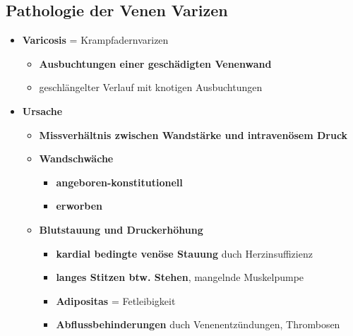 	\subsection{Pathologie der Venen Varizen}
		\begin{itemize}
			\item \textbf{Varicosis} = Krampfadernvarizen
				\begin{itemize}
					\item \textbf{Ausbuchtungen einer geschädigten Venenwand}
					\item geschlängelter Verlauf mit knotigen Ausbuchtungen
				\end{itemize}
			\item \textbf{Ursache}
				\begin{itemize}
					\item \textbf{Missverhältnis zwischen Wandstärke und intravenösem Druck}
					\item \textbf{Wandschwäche}
						\begin{itemize}
							\item \textbf{angeboren-konstitutionell}
							\item \textbf{erworben}
						\end{itemize}
					\item \textbf{Blutstauung und Druckerhöhung}
						\begin{itemize}
							\item \textbf{kardial bedingte venöse Stauung} duch Herzinsuffizienz
							\item \textbf{langes Stitzen btw. Stehen}, mangelnde Muskelpumpe
							\item \textbf{Adipositas} = Fetleibigkeit
							\item \textbf{Abflussbehinderungen} duch Venenentzündungen, Thrombosen
						\end{itemize}
				\end{itemize}
		\end{itemize}
